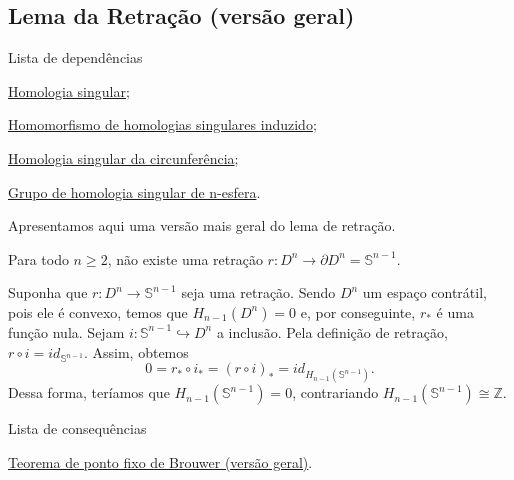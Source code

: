 
\subsection{Lema da Retração (versão geral)} %

\label{lema-de-retracao-geral-prop}
\begin{titlemize}{Lista de dependências}
    \item \hyperref[homologia-singular-def]{Homologia singular};\\
    \item \hyperref[homomorfismo-de-homologias-singulares-induzido-prop]{Homomorfismo de homologias singulares induzido};\\
    \item \hyperref[homologia-singular-de-S1-prop]{Homologia singular da circunferência};\\
    \item \hyperref[grupo-de-homologia-singular-de-n-esfera-prop]{Grupo de homologia singular de n-esfera}.
\end{titlemize}

Apresentamos aqui uma versão mais geral do lema de retração.

\begin{lemma}
	Para todo $n\ge 2$, não existe uma retração $r:D^n \longrightarrow \partial D^n = \mathbb{S}^{n-1}$.
\end{lemma}

\begin{dem}
Suponha que $r:D^{n} \longrightarrow \mathbb{S}^{n-1}$ seja uma retração. Sendo $D^n$ um espaço contrátil, pois ele é convexo, temos que $H_{n-1}(D^n)=0$ e, por conseguinte, $r_*$ é uma função nula. Sejam $i:\mathbb{S}^{n-1}\hookrightarrow D^n$ a inclusão. Pela definição de retração, $r\circ i=id_{\mathbb{S}^{n-1}}$. Assim, obtemos 
\[0=r_*\circ i_*=(r\circ i)_*=id_{H_{n-1}(\mathbb{S}^{n-1})}.\]
Dessa forma, teríamos que $H_{n-1}(\mathbb{S}^{n-1})=0$, contrariando $H_{n-1}(\mathbb{S}^{n-1})\cong \mathbb{Z}$.
\end{dem}

\begin{titlemize}{Lista de consequências}
    \item \hyperref[teorema-de-ponto-fixo-de-brouwer-geral-prop]{Teorema de ponto fixo de Brouwer (versão geral)}.
\end{titlemize}
